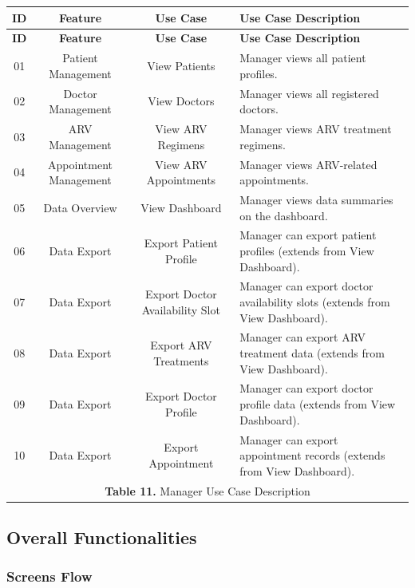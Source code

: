 \documentclass[12pt,a4paper]{article}
\begin{document}
\renewcommand{\arraystretch}{1.5}
\begin{longtable}{|c|c|c|p{7.5cm}|}
\hline
\textbf{ID} & \textbf{Feature} & \textbf{Use Case} & \textbf{Use Case Description} \\
\hline
\endfirsthead

\hline
\textbf{ID} & \textbf{Feature} & \textbf{Use Case} & \textbf{Use Case Description} \\
\hline
\endhead

01 & Patient Management & View Patients & Manager views all patient profiles. \\
\hline
02 & Doctor Management & View Doctors & Manager views all registered doctors. \\
\hline
03 & ARV Management & View ARV Regimens & Manager views ARV treatment regimens. \\
\hline
04 & Appointment Management & View ARV Appointments & Manager views ARV-related appointments. \\
\hline
05 & Data Overview & View Dashboard & Manager views data summaries on the dashboard. \\
\hline
06 & Data Export & Export Patient Profile & Manager can export patient profiles (extends from View Dashboard). \\
\hline
07 & Data Export & Export Doctor Availability Slot & Manager can export doctor availability slots (extends from View Dashboard). \\
\hline
08 & Data Export & Export ARV Treatments & Manager can export ARV treatment data (extends from View Dashboard). \\
\hline
09 & Data Export & Export Doctor Profile & Manager can export doctor profile data (extends from View Dashboard). \\
\hline
10 & Data Export & Export Appointment & Manager can export appointment records (extends from View Dashboard). \\
\hline
\multicolumn{4}{|c|}{\textbf{Table 11.} Manager Use Case Description} \\
\hline
\end{longtable}


\subsection{Overall Functionalities}

\subsubsection{Screens Flow}
\end{document}
